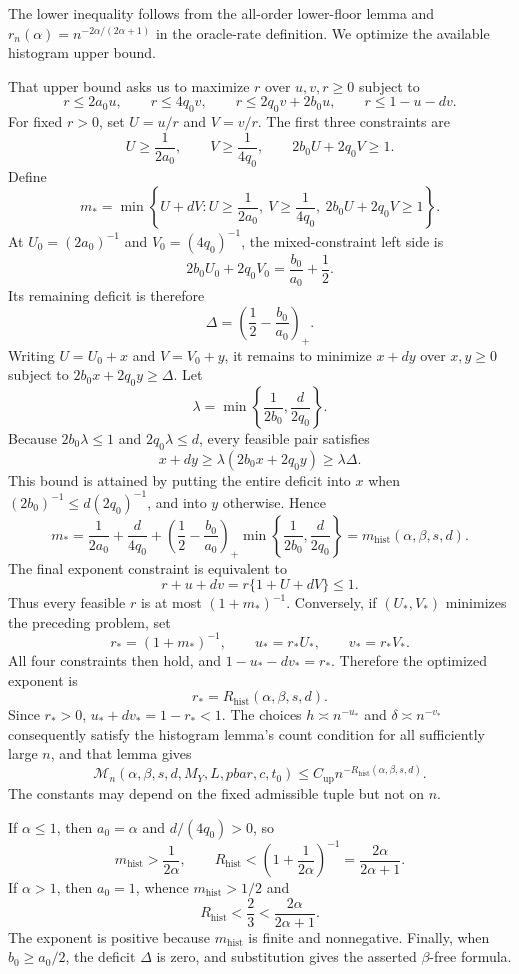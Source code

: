 The lower inequality follows from the all-order lower-floor lemma and \(r_n(\alpha)=n^{-2\alpha/(2\alpha+1)}\) in the oracle-rate definition. We optimize the available histogram upper bound.

That upper bound asks us to maximize \(r\) over \(u,v,r\ge0\) subject to
\[
r\le2a_0u,
\qquad r\le4q_0v,
\qquad r\le2q_0v+2b_0u,
\qquad r\le1-u-dv.
\]
For fixed \(r>0\), set \(U=u/r\) and \(V=v/r\). The first three constraints are
\[
U\ge\frac{1}{2a_0},
\qquad V\ge\frac{1}{4q_0},
\qquad 2b_0U+2q_0V\ge1.
\]
Define
\[
m_*=
\min\left\{U+dV:
U\ge\frac{1}{2a_0},
\ V\ge\frac{1}{4q_0},
\ 2b_0U+2q_0V\ge1
\right\}.
\]
At \(U_0=(2a_0)^{-1}\) and \(V_0=(4q_0)^{-1}\), the mixed-constraint left side is
\[
2b_0U_0+2q_0V_0=\frac{b_0}{a_0}+\frac12.
\]
Its remaining deficit is therefore
\[
\Delta=\left(\frac12-\frac{b_0}{a_0}\right)_+.
\]
Writing \(U=U_0+x\) and \(V=V_0+y\), it remains to minimize \(x+dy\) over \(x,y\ge0\) subject to \(2b_0x+2q_0y\ge\Delta\). Let
\[
\lambda=\min\left\{\frac{1}{2b_0},\frac{d}{2q_0}\right\}.
\]
Because \(2b_0\lambda\le1\) and \(2q_0\lambda\le d\), every feasible pair satisfies
\[
x+dy\ge\lambda(2b_0x+2q_0y)\ge\lambda\Delta.
\]
This bound is attained by putting the entire deficit into \(x\) when \((2b_0)^{-1}\le d(2q_0)^{-1}\), and into \(y\) otherwise. Hence
\[
m_*
=
\frac{1}{2a_0}+\frac{d}{4q_0}
+
\left(\frac12-\frac{b_0}{a_0}\right)_+
\min\left\{\frac{1}{2b_0},\frac{d}{2q_0}\right\}
=
m_{\mathrm{hist}}(\alpha,\beta,s,d).
\]
The final exponent constraint is equivalent to
\[
r+u+dv=r\{1+U+dV\}\le1.
\]
Thus every feasible \(r\) is at most \((1+m_*)^{-1}\). Conversely, if \((U_*,V_*)\) minimizes the preceding problem, set
\[
r_*=(1+m_*)^{-1},
\qquad u_*=r_*U_*,
\qquad v_*=r_*V_*.
\]
All four constraints then hold, and \(1-u_*-dv_*=r_*\). Therefore the optimized exponent is
\[
r_*=R_{\mathrm{hist}}(\alpha,\beta,s,d).
\]
Since \(r_*>0\), \(u_*+dv_*=1-r_*<1\). The choices \(h\asymp n^{-u_*}\) and \(\delta\asymp n^{-v_*}\) consequently satisfy the histogram lemma's count condition for all sufficiently large \(n\), and that lemma gives
\[
\mathcal M_n(\alpha,\beta,s,d,M_Y,L,pbar,c,t_0)
\le
C_{\mathrm{up}}n^{-R_{\mathrm{hist}}(\alpha,\beta,s,d)}.
\]
The constants may depend on the fixed admissible tuple but not on \(n\).

If \(\alpha\le1\), then \(a_0=\alpha\) and \(d/(4q_0)>0\), so
\[
m_{\mathrm{hist}}>\frac{1}{2\alpha},
\qquad
R_{\mathrm{hist}}<\left(1+\frac{1}{2\alpha}\right)^{-1}
=
\frac{2\alpha}{2\alpha+1}.
\]
If \(\alpha>1\), then \(a_0=1\), whence \(m_{\mathrm{hist}}>1/2\) and
\[
R_{\mathrm{hist}}<\frac23<\frac{2\alpha}{2\alpha+1}.
\]
The exponent is positive because \(m_{\mathrm{hist}}\) is finite and nonnegative. Finally, when \(b_0\ge a_0/2\), the deficit \(\Delta\) is zero, and substitution gives the asserted \(\beta\)-free formula.